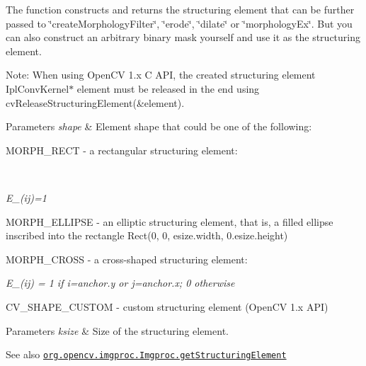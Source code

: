 The function constructs and returns the structuring element that can be further passed to \char`\"{}create\+Morphology\+Filter\char`\"{}, \char`\"{}erode\char`\"{}, \char`\"{}dilate\char`\"{} or \char`\"{}morphology\+Ex\char`\"{}. But you can also construct an arbitrary binary mask yourself and use it as the structuring element.

Note\+: When using Open\+CV 1.\+x C A\+PI, the created structuring element {\ttfamily Ipl\+Conv\+Kernel$\ast$ element} must be released in the end using {\ttfamily cv\+Release\+Structuring\+Element(\&element)}.


\begin{DoxyParams}{Parameters}
{\em shape} & Element shape that could be one of the following\+: 
\begin{DoxyItemize}
\item M\+O\+R\+P\+H\+\_\+\+R\+E\+CT -\/ a rectangular structuring element\+: 
\end{DoxyItemize}\\
\hline
\end{DoxyParams}


{\itshape E\+\_\+(ij)=1}


\begin{DoxyItemize}
\item M\+O\+R\+P\+H\+\_\+\+E\+L\+L\+I\+P\+SE -\/ an elliptic structuring element, that is, a filled ellipse inscribed into the rectangle {\ttfamily Rect(0, 0, esize.\+width, 0.\+esize.\+height)} 
\item M\+O\+R\+P\+H\+\_\+\+C\+R\+O\+SS -\/ a cross-\/shaped structuring element\+: 
\end{DoxyItemize}

{\itshape E\+\_\+(ij) = 1 if i=anchor.\+y or j=anchor.\+x; 0 otherwise}


\begin{DoxyItemize}
\item C\+V\+\_\+\+S\+H\+A\+P\+E\+\_\+\+C\+U\+S\+T\+OM -\/ custom structuring element (Open\+CV 1.\+x A\+PI) 
\end{DoxyItemize}
\begin{DoxyParams}{Parameters}
{\em ksize} & Size of the structuring element.\\
\hline
\end{DoxyParams}
\begin{DoxySeeAlso}{See also}
\href{http://docs.opencv.org/modules/imgproc/doc/filtering.html#getstructuringelement}{\tt org.\+opencv.\+imgproc.\+Imgproc.\+get\+Structuring\+Element} 
\end{DoxySeeAlso}
\mbox{\label{classorg_1_1opencv_1_1imgproc_1_1_imgproc_a55ca9c014b3e7fcbda05ad5d9e5e2b3e}} 
